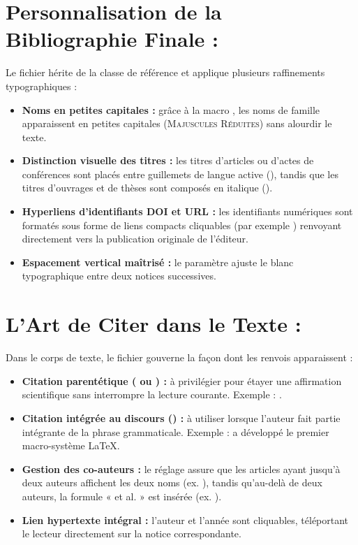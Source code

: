 \section{Personnalisation de la Bibliographie Finale : }
\label{sec:bbx-detail}

Le fichier  hérite de la classe de référence 
et applique plusieurs raffinements typographiques :

\begin{itemize}
  \item \textbf{Noms en petites capitales :}
  grâce à la macro ,
  les noms de famille apparaissent en petites capitales (\textsc{Majuscules Réduites}) sans alourdir le texte.
  \item \textbf{Distinction visuelle des titres :}
  les titres d'articles ou d'actes de conférences sont placés entre guillemets de langue active (),
  tandis que les titres d'ouvrages et de thèses sont composés en italique ().
  \item \textbf{Hyperliens d'identifiants DOI et URL :}
  les identifiants numériques sont formatés sous forme de liens compacts cliquables
  (par exemple ) renvoyant directement vers la publication originale de l'éditeur.
  \item \textbf{Espacement vertical maîtrisé :}
  le paramètre  ajuste le blanc typographique entre deux notices successives.
\end{itemize}

\section{L'Art de Citer dans le Texte : }
\label{sec:cbx-detail}

Dans le corps de texte, le fichier  gouverne la façon dont les renvois apparaissent :

\begin{itemize}
  \item \textbf{Citation parentétique ( ou ) :}
  à privilégier pour étayer une affirmation scientifique sans interrompre la lecture courante.
  Exemple : \autocite{knuth1984texbook}.
  \item \textbf{Citation intégrée au discours () :}
  à utiliser lorsque l'auteur fait partie intégrante de la phrase grammaticale.
  Exemple : \textcite{lamport1994latex} a développé le premier macro-système \LaTeX{}.
  \item \textbf{Gestion des co-auteurs :}
  le réglage  assure que les articles ayant jusqu'à deux auteurs
  affichent les deux noms (ex. \textcite{mittelbach2023latex}),
  tandis qu'au-delà de deux auteurs,
  la formule « et al. » est insérée (ex. \textcite{lehman2024biblatex}).
  \item \textbf{Lien hypertexte intégral :}
  l'auteur et l'année sont cliquables, téléportant le lecteur directement sur la notice correspondante.
\end{itemize}

